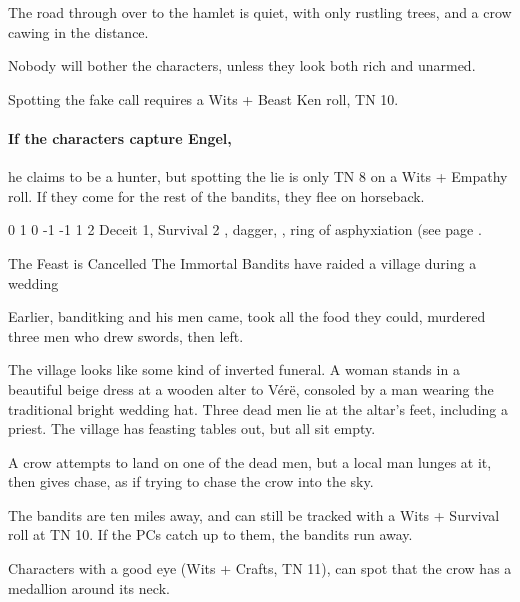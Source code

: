 \begin{multicols}{2}
\begin{boxtext}

	The road through over to the hamlet is quiet, with only rustling trees, and a crow cawing in the distance.

\end{boxtext}

Nobody will bother the characters, unless they look both rich and unarmed.

Spotting the fake call requires a Wits + Beast Ken roll, TN 10.

\paragraph{If the characters capture Engel,}
he claims to be a hunter, but spotting the lie is only TN 8 on a Wits + Empathy roll.
If they come for the rest of the bandits, they flee on horseback.


{0}%
{1}%
{{0}%
{-1}%
{-1}}%
{1}%
{2}%
{Deceit 1, Survival 2}%
{\shortsword, dagger, \partialleather, ring of asphyxiation (see page \pageref{ring_asphyxiation}.}%
{}

{The Feast is Cancelled}%
{The Immortal Bandits have raided a village during a wedding}%

Earlier, \gls{banditking} and his men came, took all the food they could, murdered three men who drew swords, then left.

\begin{boxtext}

	The village looks like some kind of inverted funeral.
	A woman stands in a beautiful beige dress at a wooden alter to V\'{e}r\"{e}, consoled by a man wearing the traditional bright wedding hat.
	Three dead men lie at the altar's feet, including a priest.
	The village has feasting tables out, but all sit empty.

	A crow attempts to land on one of the dead men, but a local man lunges at it, then gives chase, as if trying to chase the crow into the sky.

\end{boxtext}

The bandits are ten miles away, and can still be tracked with a Wits + Survival roll at TN 10.
If the PCs catch up to them, the bandits run away.

Characters with a good eye (Wits + Crafts, TN 11), can spot that the crow has a medallion around its neck.


\end{multicols}
